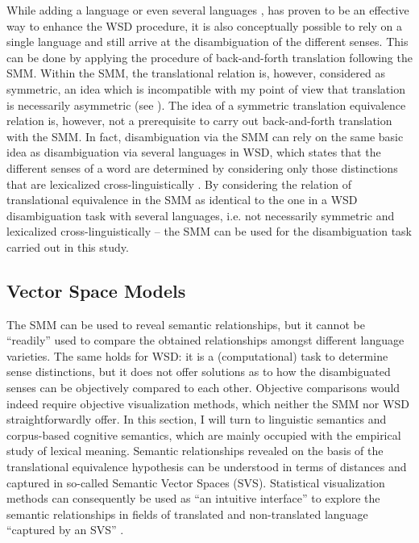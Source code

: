 While adding a language or even several languages \citep{gelbukh_five_2013}, has proven to be an effective way to enhance the WSD procedure, it is also conceptually possible to rely on a single language and still arrive at the disambiguation of the different senses. This can be done by applying the procedure of back-and-forth translation following the SMM. Within the SMM, the translational relation is, however, considered as symmetric, an idea which is incompatible with my point of view that translation is necessarily asymmetric (see ). The idea of a symmetric translation equivalence relation is, however, not a prerequisite to carry out back-and-forth translation with the SMM. In fact, disambiguation via the SMM can rely on the same basic idea as disambiguation via several languages in WSD, which states that the different senses of a word are determined by considering only those distinctions that are lexicalized cross-linguistically \citep[54]{agirre_making_2007}. By considering the relation of translational equivalence in the SMM as identical to the one in a WSD disambiguation task with several languages, i.e. not necessarily symmetric and lexicalized cross-linguistically – the SMM can be used for the disambiguation task carried out in this study.

\subsection{Vector Space Models}
\label{sec:2.4.2}  
The SMM can be used to reveal semantic relationships, but it cannot be “readily” used to compare the obtained relationships amongst different language varieties. The same holds for WSD: it is a (computational) task to determine sense distinctions, but it does not offer solutions as to how the disambiguated senses can be objectively compared to each other. Objective comparisons would indeed require objective visualization methods, which neither the SMM nor WSD straightforwardly offer. In this section, I will turn to linguistic semantics and corpus-based cognitive semantics, which are mainly occupied with the empirical study of lexical meaning. Semantic relationships revealed on the basis of the translational equivalence hypothesis can be understood in terms of distances and captured in so-called Semantic Vector Spaces (SVS). Statistical visualization methods can consequently be used as “an intuitive interface” \citep[17]{heylen_looking_2012} to explore the semantic relationships in fields of translated and non-translated language “captured by an SVS” \citep{heylen_looking_2012}.

